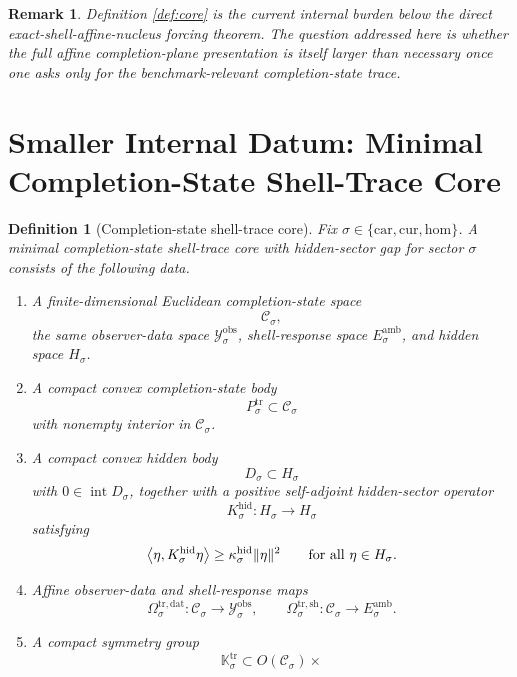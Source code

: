 \documentclass[11pt]{article}
\newcommand{\Car}{\mathrm{car}}
\newcommand{\Cur}{\mathrm{cur}}
\newcommand{\Hom}{\mathrm{hom}}
\newcommand{\DataSpace}[1]{\mathcal Y_{#1}^{\mathrm{obs}}}
\newcommand{\AmbientTarget}[1]{E_{#1}^{\mathrm{amb}}}
\newcommand{\CoreState}[1]{\mathcal C_{#1}}
\newcommand{\GapSpace}[1]{H_{#1}}
\newcommand{\GapBody}[1]{D_{#1}}
\newcommand{\HiddenOperator}[1]{K_{#1}^{\mathrm{hid}}}
\newcommand{\TraceBody}[1]{P_{#1}^{\mathrm{tr}}}
\newcommand{\TraceDataMap}[1]{\Omega_{#1}^{\mathrm{tr,dat}}}
\newcommand{\TraceShellMap}[1]{\Omega_{#1}^{\mathrm{tr,sh}}}
\newcommand{\TraceSym}[1]{\mathbb K_{#1}^{\mathrm{tr}}}
\newtheorem{definition}{Definition}
\newtheorem{remark}{Remark}
\begin{document}
\begin{remark}
Definition \ref{def:core} is the current internal burden below the direct exact-shell-affine-nucleus forcing theorem. The question addressed here is whether the full affine completion-plane presentation is itself larger than necessary once one asks only for the benchmark-relevant completion-state trace.
\end{remark}

\section{Smaller Internal Datum: Minimal Completion-State Shell-Trace Core}

\begin{definition}[Completion-state shell-trace core]
\label{def:trace}
Fix \(\sigma\in\{\Car,\Cur,\Hom\}\). A \emph{minimal completion-state shell-trace core with hidden-sector gap} for sector \(\sigma\) consists of the following data.
\begin{enumerate}
    \item A finite-dimensional Euclidean completion-state space
    \[
    \CoreState{\sigma},
    \]
    the same observer-data space \(\DataSpace{\sigma}\), shell-response space \(\AmbientTarget{\sigma}\), and hidden space \(\GapSpace{\sigma}\).
    \item A compact convex completion-state body
    \[
    \TraceBody{\sigma}\subset\CoreState{\sigma}
    \]
    with nonempty interior in \(\CoreState{\sigma}\).
    \item A compact convex hidden body
    \[
    \GapBody{\sigma}\subset\GapSpace{\sigma}
    \]
    with \(0\in\operatorname{int}\GapBody{\sigma}\), together with a positive self-adjoint hidden-sector operator
    \[
    \HiddenOperator{\sigma}:\GapSpace{\sigma}\to\GapSpace{\sigma}
    \]
    satisfying
    \begin{equation}
    \ev{\eta,\HiddenOperator{\sigma}\eta}
    \ge
    \kappa_{\sigma}^{\mathrm{hid}}\|\eta\|^{2}
    \qquad
    \text{for all }\eta\in\GapSpace{\sigma}.
    \label{eq:tracegap}
    \end{equation}
    \item Affine observer-data and shell-response maps
    \[
    \TraceDataMap{\sigma}:\CoreState{\sigma}\to\DataSpace{\sigma},
    \qquad
    \TraceShellMap{\sigma}:\CoreState{\sigma}\to\AmbientTarget{\sigma}.
    \]
    \item A compact symmetry group
    \[
    \TraceSym{\sigma}\subset
    O(\CoreState{\sigma})\times
\]
\end{enumerate}
\end{definition}
\end{document}
